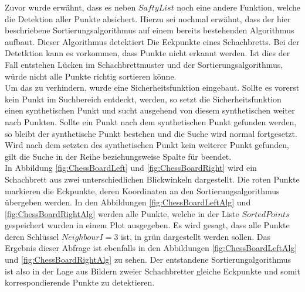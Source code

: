 Zuvor wurde erwähnt, dass es neben $SaftyList$ noch eine andere Funktion, welche die Detektion aller Punkte absichert. Hierzu sei nochmal erwähnt, dass der hier beschriebene Sortierungsalgorithmus auf einem bereits bestehenden Algorithmus aufbaut. Dieser Algorithmus detektiert Die Eckpunkte eines Schachbretts. Bei der Detetktion kann es vorkommen, dass Punkte nicht erkannt werden. Ist dies der Fall entstehen Lücken im Schachbrettmuster und der Sortierungsalgorithmus, würde nicht alle Punkte richtig sortieren könne.\\

Um das zu verhindern, wurde eine Sicherheitsfunktion eingebaut. Sollte es vorerst kein Punkt im Suchbereich entdeckt, werden, so setzt die Sicherheitsfunktion einen synthetischen Punkt und sucht ausgehend von diesem synthetischen weiter nach Punkten. Sollte ein Punkt nach dem synthetischen Punkt gefunden werden, so bleibt der synthetische Punkt bestehen und die Suche wird normal fortgesetzt. Wird nach dem setzten des synthetischen Punkt kein weiterer Punkt gefunden, gilt die Suche in der Reihe beziehungsweise Spalte für beendet.\\

In Abbildung \ref{fig:ChessBoardLeft} und \ref{fig:ChessBoardRight} wird ein Schachbrett aus zwei unterschiedlichen Blickwinkeln dargestellt. Die roten Punkte markieren die Eckpunkte, deren Koordinaten an den Sortierungsalgorithmus übergeben werden. In den Abbildungen \ref{fig:ChessBoardLeftAlg} und \ref{fig:ChessBoardRightAlg} werden alle Punkte, welche in der Liste $SortedPoints$ gespeichert wurden in einem Plot ausgegeben. Es wird gesagt, dass alle Punkte deren Schlüssel $NeighbourI = 3$ ist, in grün dargestellt werden sollen. Das Ergebnis dieser Abfrage ist ebenfalls in den Abbildungen \ref{fig:ChessBoardLeftAlg} und \ref{fig:ChessBoardRightAlg} zu sehen. Der entstandene Sortierungalgorithmus ist also in der Lage aus Bildern zweier Schachbretter gleiche Eckpunkte und somit korrespondierende Punkte zu detektieren. 



